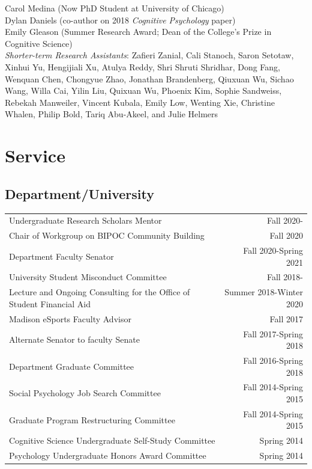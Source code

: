 \documentclass[a4paper,10pt]{article}
\begin{document}
Carol Medina (Now PhD Student at University of Chicago) \\

Dylan Daniels (co-author on 2018 {\em Cognitive Psychology} paper) \\

Emily Gleason (Summer Research Award; Dean of the College's Prize in Cognitive Science) \\

{\em Shorter-term Research Assistants}: Zafieri Zanial, Cali Stanoch, Saron Setotaw, Xinhui Yu, Hengijiali Xu, Atulya Reddy, Shri Shruti Shridhar, Dong Fang, Wenquan Chen, Chongyue Zhao, Jonathan Brandenberg, Qiuxuan Wu, Sichao Wang, Willa Cai, Yilin Liu, Quixuan Wu, Phoenix Kim, Sophie Sandweiss, Rebekah Manweiler, Vincent Kubala, Emily Low, Wenting Xie, Christine Whalen, Philip Bold, Tariq Abu-Akeel, and Julie Helmers

\section{Service}
\subsection{Department/University}
\begin{tabu}{Xr}
Undergraduate Research Scholars Mentor & Fall 2020- \\
Chair of Workgroup on BIPOC Community Building & Fall 2020 \\
Department Faculty Senator & Fall 2020-Spring 2021\\
University Student Misconduct Committee & Fall 2018- \\
Lecture and Ongoing Consulting for the Office of Student Financial Aid & Summer 2018-Winter 2020 \\
Madison eSports Faculty Advisor & Fall 2017 \\
Alternate Senator to faculty Senate & Fall 2017-Spring 2018 \\
Department Graduate Committee & Fall 2016-Spring 2018 \\
Social Psychology Job Search Committee & Fall 2014-Spring 2015 \\
Graduate Program Restructuring Committee & Fall 2014-Spring 2015 \\
Cognitive Science Undergraduate Self-Study Committee & Spring 2014 \\
Psychology Undergraduate Honors Award Committee & Spring 2014 \\
\end{tabu}
\end{document}
